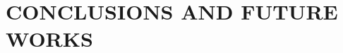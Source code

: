 \documentclass[a4paper, 10pt, conference]{ieeeconf}      %
\begin{document}


\section{CONCLUSIONS AND FUTURE WORKS}


\end{document}
